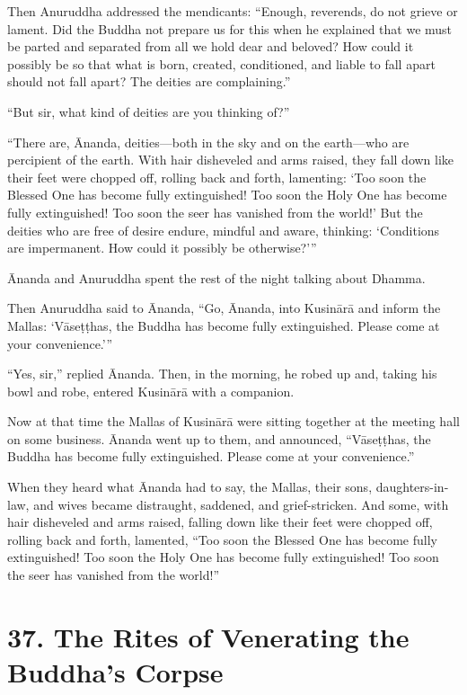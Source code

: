 \documentclass[12pt,openany]{book}%
\begin{document}
Then Anuruddha addressed the mendicants: “Enough, reverends, do not grieve or lament. Did the Buddha not prepare us for this when he explained that we must be parted and separated from all we hold dear and beloved? How could it possibly be so that what is born, created, conditioned, and liable to fall apart should not fall apart? The deities are complaining.” 

“But sir, what kind of deities are you thinking of?” 

“There are, Ānanda, deities—both in the sky and on the earth—who are percipient of the earth. With hair disheveled and arms raised, they fall down like their feet were chopped off, rolling back and forth, lamenting: ‘Too soon the Blessed One has become fully extinguished! Too soon the Holy One has become fully extinguished! Too soon the seer has vanished from the world!’ But the deities who are free of desire endure, mindful and aware, thinking: ‘Conditions are impermanent. How could it possibly be otherwise?’” 

Ānanda and Anuruddha spent the rest of the night talking about Dhamma. 

Then Anuruddha said to Ānanda, “Go, Ānanda, into \textsanskrit{Kusinārā} and inform the Mallas: ‘\textsanskrit{Vāseṭṭhas}, the Buddha has become fully extinguished. Please come at your convenience.’” 

“Yes, sir,” replied Ānanda. Then, in the morning, he robed up and, taking his bowl and robe, entered \textsanskrit{Kusinārā} with a companion. 

Now at that time the Mallas of \textsanskrit{Kusinārā} were sitting together at the meeting hall on some business. Ānanda went up to them, and announced, “\textsanskrit{Vāseṭṭhas}, the Buddha has become fully extinguished. Please come at your convenience.” 

When they heard what Ānanda had to say, the Mallas, their sons, daughters-in-law, and wives became distraught, saddened, and grief-stricken. And some, with hair disheveled and arms raised, falling down like their feet were chopped off, rolling back and forth, lamented, “Too soon the Blessed One has become fully extinguished! Too soon the Holy One has become fully extinguished! Too soon the seer has vanished from the world!” 

\section*{37. The Rites of Venerating the Buddha’s Corpse }
\end{document}
